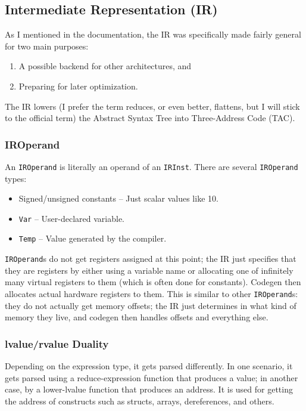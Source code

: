 \documentclass{article}
\begin{document}
\subsection{Intermediate Representation (IR)}
As I mentioned in the documentation, the IR was specifically made fairly general for two main purposes:
\begin{enumerate}
    \item A possible backend for other architectures, and
    \item Preparing for later optimization.
\end{enumerate}

The IR lowers (I prefer the term reduces, or even better, flattens, but I will stick to the official term) the Abstract Syntax Tree into Three-Address Code (TAC).

\subsubsection{IROperand}
An \texttt{IROperand} is literally an operand of an \texttt{IRInst}. There are several \texttt{IROperand} types:
\begin{itemize}
    \item Signed/unsigned constants – Just scalar values like 10.
    \item \texttt{Var} – User-declared variable.
    \item \texttt{Temp} – Value generated by the compiler.
\end{itemize}

\texttt{IROperand}s do not get registers assigned at this point; the IR just specifies that they are registers by either using a variable name or allocating one of infinitely many virtual registers to them (which is often done for constants). Codegen then allocates actual hardware registers to them. This is similar to other \texttt{IROperand}s: they do not actually get memory offsets; the IR just determines in what kind of memory they live, and codegen then handles offsets and everything else.

\subsubsection{lvalue/rvalue Duality}
Depending on the expression type, it gets parsed differently. In one scenario, it gets parsed using a reduce-expression function that produces a value; in another case, by a lower-lvalue function that produces an address. It is used for getting the address of constructs such as structs, arrays, dereferences, and others. 
\end{document}
